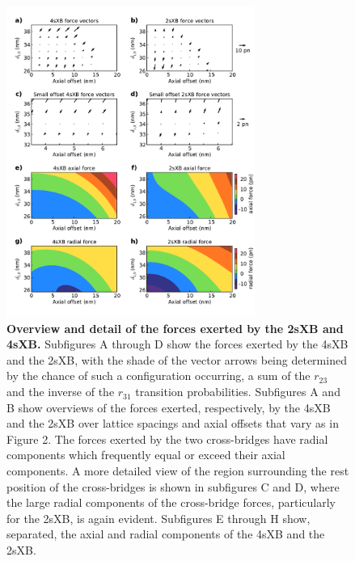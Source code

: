 \documentclass[]{article}
\begin{document}
\begin{figure}[ht]
    \begin{center}
    \includegraphics[width=3.2in]{../imgs/Figure4.pdf}
    \caption{
        \label{fig_forces}
        \textbf{Overview and detail of the forces exerted by the 2sXB and 4sXB\@.}
        Subfigures A through D show the forces exerted by the 4sXB and the 2sXB, with the shade of the vector arrows being determined by the chance of such a configuration occurring, a sum of the $r_{23}$ and the inverse of the $r_{31}$ transition probabilities. 
        Subfigures A and B show overviews of the forces exerted, respectively, by the 4sXB and the 2sXB over lattice spacings and axial offsets that vary as in Figure 2.
        The forces exerted by the two cross-bridges have radial components which frequently equal or exceed their axial components.
        A more detailed view of the region surrounding the rest position of the cross-bridges is shown in subfigures C and D, where the large radial components of the cross-bridge forces, particularly for the 2sXB, is again evident.
        Subfigures E through H show, separated, the axial and radial components of the 4sXB and the 2sXB\@.
    }
    \end{center}
\end{figure}

\clearpage


\end{document}
